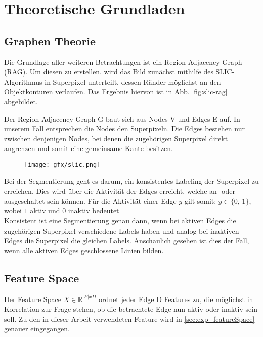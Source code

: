 \chapter{Theoretische Grundladen}\label{ch:theoretischeGrundlagen}
\section{Graphen Theorie}\label{sec:graphTheory}

Die Grundlage aller weiteren Betrachtungen ist ein Region Adjacency Graph (RAG). Um diesen zu erstellen, wird das Bild zunächst mithilfe des SLIC-Algorithmus \cite{slic} in Superpixel unterteilt, dessen Ränder möglichst an den Objektkonturen verlaufen. Das Ergebnis hiervon ist in Abb. \ref{fig:slic-rag} abgebildet. 

Der Region Adjacency Graph G baut sich aus Nodes V und Edges E auf. In unserem Fall entsprechen die Nodes den Superpixeln. Die Edges bestehen nur zwischen denjenigen Nodes, bei denen die zugehörigen Superpixel direkt angrenzen und somit eine gemeinsame Kante besitzen. 

\begin{figure}[H]
	{\texttt{[image: gfx/slic.png]}}
\end{figure}
\label{fig:slic-rag}

\vspace{0.5cm}


Bei der Segmentierung geht es darum, ein konsistentes Labeling der Superpixel zu erreichen. Dies wird über die Aktivität der Edges erreicht, welche an- oder ausgeschaltet sein können. Für die Aktivität einer Edge $y$ gilt somit: $y \in \{\text{0, 1}\}$, wobei $1$ aktiv und 0 inaktiv bedeutet \\
Konsistent ist eine Segmentierung genau dann, wenn bei aktiven Edges die zugehörigen Superpixel verschiedene Labels haben und analog bei inaktiven Edges die Superpixel die gleichen Labels. Anschaulich gesehen ist dies der Fall, wenn alle aktiven Edges geschlossene Linien bilden.


\section{Feature Space}\label{sec:featureSpace}

Der Feature Space $X \in \mathbb{R}^{|E|xD}$ ordnet jeder Edge D Features zu, die möglichst in Korrelation zur Frage stehen, ob die betrachtete Edge nun aktiv oder inaktiv sein soll. Zu den in dieser Arbeit verwendeten Feature wird in \ref{sec:exp_featureSpace} genauer eingegangen.



